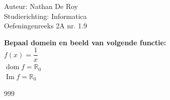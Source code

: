 \documentclass[a4paper]{article}
\begin{document}
\noindent \large Auteur: Nathan De Roy \\
\noindent \large Studierichting: Informatica\\
\noindent \large Oefeningenreeks 2A nr. 1.9\\

\medskip

\normalsize

\textbf{Bepaal domein en beeld van volgende functie:}\\

$f(x) = \dfrac{1}{x}$\\

$\operatorname{dom}f = \mathbb{R}_{0}$\\

$\operatorname{Im}f = \mathbb{R}_{0}$\\

\begin{thebibliography}{999}
\end{thebibliography}
\end{document}
